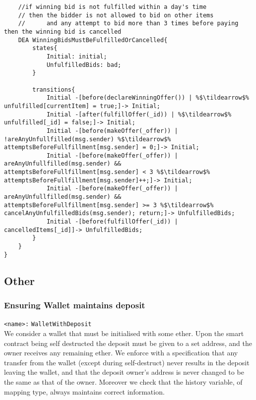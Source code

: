 \documentclass{article}
\newcommand{\tildearrow}{{\raise.37ex\hbox{$\scriptstyle\mathtt{\sim}$}}\hspace{-0.08cm}>\xspace}
\begin{document}
\begin{lstlisting}
    //if winning bid is not fulfilled within a day's time
    // then the bidder is not allowed to bid on other items
    //      and any attempt to bid more than 3 times before paying then the winning bid is cancelled 
    DEA WinningBidsMustBeFulfilledOrCancelled{
        states{
            Initial: initial;
            UnfulfilledBids: bad;
        }

        transitions{
            Initial -[before(declareWinningOffer()) | %$\tildearrow$% unfulfilled[currentItem] = true;]-> Initial;
            Initial -[after(fulfillOffer(_id)) | %$\tildearrow$% unfulfilled[_id] = false;]-> Initial;
            Initial -[before(makeOffer(_offer)) | !areAnyUnfullfilled(msg.sender) %$\tildearrow$% attemptsBeforeFullfillment[msg.sender] = 0;]-> Initial;
            Initial -[before(makeOffer(_offer)) | areAnyUnfullfilled(msg.sender) && attemptsBeforeFullfillment[msg.sender] < 3 %$\tildearrow$% attemptsBeforeFullfillment[msg.sender]++;]-> Initial;
            Initial -[before(makeOffer(_offer)) | areAnyUnfullfilled(msg.sender) && attemptsBeforeFullfillment[msg.sender] >= 3 %$\tildearrow$% cancelAnyUnfulfilledBids(msg.sender); return;]-> UnfulfilledBids;
            Initial -[before(fulfillOffer(_id)) | cancelledItems[_id]]-> UnfulfilledBids;
        }
    }
}
\end{lstlisting}\normalsize

\subsection{Other}

\subsubsection{Ensuring Wallet maintains deposit}

\texttt{<name>:} \verb+WalletWithDeposit+\\

We consider a wallet that must be initialised with some ether. Upon the smart contract being self destructed the deposit must be given to a set address, and the owner receives any remaining ether. We enforce with a specification that any transfer from the wallet (except during self-destruct) never results in the deposit leaving the wallet, and that the deposit owner's address is never changed to be the same as that of the owner. Moreover we check that the history variable, of mapping type, always maintains correct information.
\end{document}
